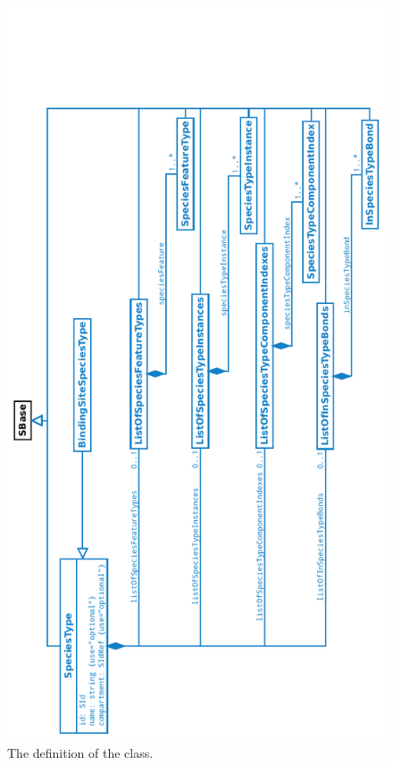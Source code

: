 \begin{figure}[htb]
  \begin{center}
    \includegraphics[angle=-90, scale=0.95]{./figs/multi_002_speciesType.pdf}
    \caption{The definition of the \SpeciesType class.}
  \label{fig:SpeciesType}
  \end{center}
\end{figure}

